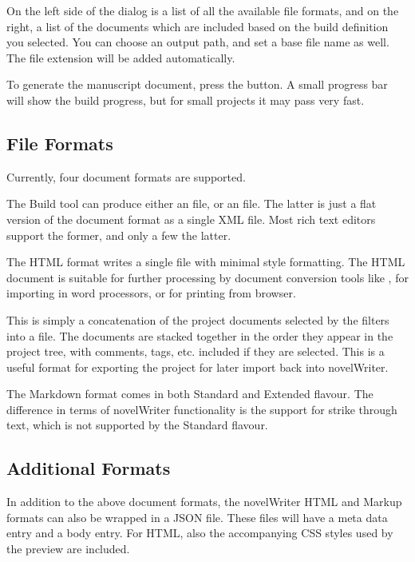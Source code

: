 \documentclass[a4paper,11pt,english]{sphinxmanual}
\begin{document}
\sphinxAtStartPar
On the left side of the dialog is a list of all the available file formats, and on the right, a
list of the documents which are included based on the build definition you selected. You can choose
an output path, and set a base file name as well. The file extension will be added automatically.

\sphinxAtStartPar
To generate the manuscript document, press the  button. A small progress bar will
show the build progress, but for small projects it may pass very fast.


\subsection{File Formats}
\label{\detokenize{project_manuscript:file-formats}}
\sphinxAtStartPar
Currently, four document formats are supported.
\begin{description}
\sphinxAtStartPar
The Build tool can produce either an  file, or an  file. The latter is just a
flat version of the document format as a single XML file. Most rich text editors support the
former, and only a few the latter.

\sphinxAtStartPar
The HTML format writes a single  file with minimal style formatting. The HTML document
is suitable for further processing by document conversion tools like , for importing in
word processors, or for printing from browser.

\sphinxAtStartPar
This is simply a concatenation of the project documents selected by the filters into a 
file. The documents are stacked together in the order they appear in the project tree, with
comments, tags, etc. included if they are selected. This is a useful format for exporting the
project for later import back into novelWriter.

\sphinxAtStartPar
The Markdown format comes in both Standard and Extended flavour. The  difference in terms
of novelWriter functionality is the support for strike through text, which is not supported by
the Standard flavour.

\end{description}


\subsection{Additional Formats}
\label{\detokenize{project_manuscript:additional-formats}}
\sphinxAtStartPar
In addition to the above document formats, the novelWriter HTML and Markup formats can also be
wrapped in a JSON file. These files will have a meta data entry and a body entry. For HTML, also
the accompanying CSS styles used by the preview are included.
\end{document}
